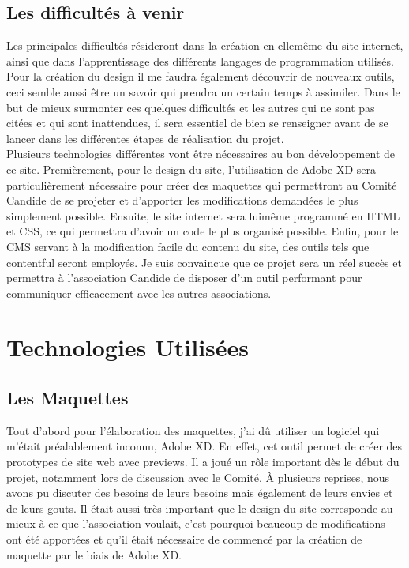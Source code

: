 \documentclass[a4,10pt,french]{sphinxmanual}
\begin{document}
\section{Les difficultés à venir}
\label{\detokenize{introduction:les-difficultes-a-venir}}
\sphinxAtStartPar
Les principales difficultés résideront dans la création en elle\sphinxhyphen{}même du site internet, ainsi que dans l’apprentissage des différents langages de programmation utilisés. Pour la création du design il me faudra également découvrir de nouveaux outils, ceci semble aussi être un savoir qui prendra un certain temps à assimiler. Dans le but de mieux surmonter ces quelques difficultés et les autres qui ne sont pas citées et qui sont inattendues, il sera essentiel de bien se renseigner avant de se lancer dans les différentes étapes de réalisation du projet.\\
Plusieurs technologies différentes vont être nécessaires au bon développement de ce site. Premièrement, pour le design du site, l’utilisation de Adobe XD sera particulièrement nécessaire pour créer des maquettes qui permettront au Comité Candide de se projeter et d’apporter les modifications demandées le plus simplement possible. Ensuite, le site internet sera lui\sphinxhyphen{}même programmé en HTML et CSS, ce qui permettra d’avoir un code le plus organisé possible. Enfin, pour le CMS servant à la modification facile du contenu du site, des outils tels que contentful seront employés. Je suis convaincue que ce projet sera un réel succès et permettra à l’association Candide de disposer d’un outil performant pour communiquer efficacement avec les autres associations.


\chapter{Technologies Utilisées}
\label{\detokenize{technologies-utilisees:technologies-utilisees}}\label{\detokenize{technologies-utilisees::doc}}

\section{Les Maquettes}
\label{\detokenize{technologies-utilisees:les-maquettes}}
\sphinxAtStartPar
Tout d’abord pour l’élaboration des maquettes, j’ai dû utiliser un logiciel qui m’était préalablement inconnu, Adobe XD. En effet, cet outil permet de créer des prototypes de site web avec previews. Il a joué un rôle important dès le début du projet, notamment lors de discussion avec le Comité. À plusieurs reprises, nous avons pu discuter des besoins de leurs besoins mais également de leurs envies et de leurs gouts. Il était aussi très important que le design du site corresponde au mieux à ce que l’association voulait, c’est pourquoi beaucoup de modifications ont été apportées et qu’il était nécessaire de commencé par la création de maquette par le biais de Adobe XD.
\end{document}

